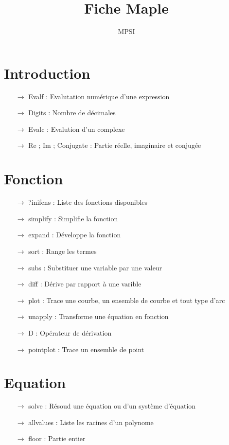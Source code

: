 \documentclass[a4paper,10pt,twocolumn]{report}
\title{Fiche Maple}
\author{MPSI}
\begin{document}
\begin{center}
\end{center}

\section{Introduction}
\begin{itemize}
\item[$\rightarrow$] Evalf : Evalutation numérique d'une expression
\item[$\rightarrow$] Digits : Nombre de décimales
\item[$\rightarrow$] Evalc : Evalution d'un complexe
\item[$\rightarrow$] Re ; Im ; Conjugate : Partie réelle, imaginaire et conjugée
\end{itemize}
\section{Fonction}
\begin{itemize}
 \item[$\rightarrow$] ?inifens : Liste des fonctions disponibles
\item[$\rightarrow$] simplify : Simplifie la fonction
\item[$\rightarrow$] expand : Développe la fonction
\item[$\rightarrow$] sort : Range les termes
\item[$\rightarrow$] subs : Substituer une variable par une valeur
\item[$\rightarrow$] diff : Dérive par rapport à une varible
\item[$\rightarrow$] plot : Trace une courbe, un ensemble de courbe et tout type d'arc
\item[$\rightarrow$] unapply : Transforme une équation en fonction
\item[$\rightarrow$] D : Opérateur de dérivation
\item[$\rightarrow$] pointplot : Trace un ensemble de point
\end{itemize}
\section{Equation}
\begin{itemize}
 \item[$\rightarrow$] solve : Résoud une équation ou d'un système d'équation
\item[$\rightarrow$] allvalues : Liste les racines d'un polynome
\item[$\rightarrow$] floor : Partie entier
\end{itemize}
\end{document}
